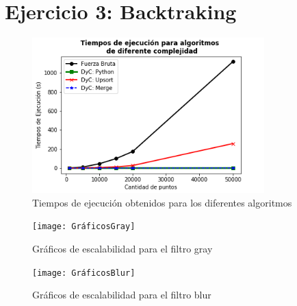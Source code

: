 \documentclass[12pt,a4paper]{article}
\begin{document}
\section{Ejercicio 3: Backtraking}




\begin{figure}
  \centering
    \includegraphics[width=0.8\textwidth]{GraficosEj1}
  \caption{Tiempos de ejecución obtenidos para los diferentes       algoritmos}
  \label{fig:ejemplo}
\end{figure}


\begin{figure}
  \centering
    \texttt{[image: GráficosGray]}
  \caption{Gráficos de escalabilidad para el filtro gray}
  \label{fig:ejemplo}
\end{figure}


\begin{figure}
  \centering
    \texttt{[image: GráficosBlur]}
  \caption{Gráficos de escalabilidad para el filtro blur}
  \label{fig:ejemplo}
\end{figure}
\end{document}
